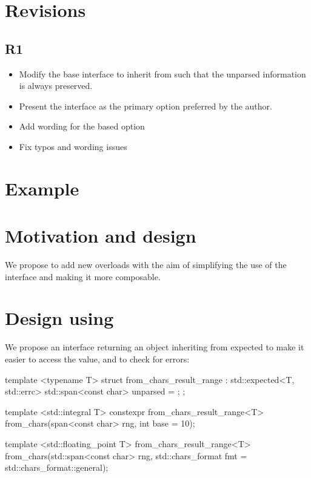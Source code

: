 \documentclass{wg21}
\begin{document}
\section{Revisions}

\subsection{R1}
\begin{itemize}
\item Modify the  base interface to inherit from  such that the unparsed information is always preserved.
\item Present the  interface as the primary option preferred by the author.
\item Add wording for the  based option
\item Fix typos and wording issues
\end{itemize}

\section{Example}


\section{Motivation and design}

We propose to add new  overloads with the aim of simplifying the use of the interface and making it more composable.


\section{Design using }

We propose an interface returning an object inheriting from expected
to make it easier to access the value, and to check for errors:

\begin{colorblock}
    template <typename T>
    struct from_chars_result_range : std::expected<T, std::errc> {
        std::span<const char> unparsed = {};
    };

    template <std::integral T>
    constexpr from_chars_result_range<T> from_chars(span<const char> rng, int base = 10);

    template <std::floating_point T>
    from_chars_result_range<T>
    from_chars(std::span<const char> rng, std::chars_format fmt = std::chars_format::general);
\end{colorblock}
\end{document}
